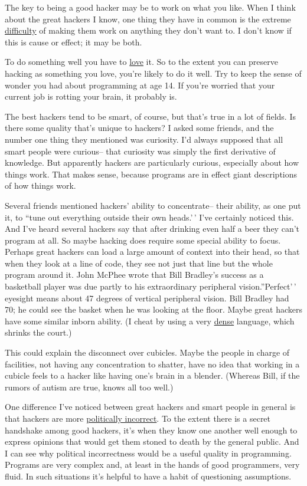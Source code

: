 \documentclass[12pt]{book}
\begin{document}
The key to being a good hacker may be to work on what you like. When I
think about the great hackers I know, one thing they have in common is
the extreme \href{procrastination.html}{difficulty} of making them work
on anything they don't want to. I don't know if this is cause or effect;
it may be both.

To do something well you have to \href{love.html}{love} it. So to the
extent you can preserve hacking as something you love, you're likely to
do it well. Try to keep the sense of wonder you had about programming at
age 14. If you're worried that your current job is rotting your brain,
it probably is.

The best hackers tend to be smart, of course, but that's true in a lot
of fields. Is there some quality that's unique to hackers? I asked some
friends, and the number one thing they mentioned was curiosity. I'd
always supposed that all smart people were curious-- that curiosity was
simply the first derivative of knowledge. But apparently hackers are
particularly curious, especially about how things work. That makes
sense, because programs are in effect giant descriptions of how things
work.

Several friends mentioned hackers' ability to concentrate-- their
ability, as one put it, to ``tune out everything outside their own
heads.'\,' I've certainly noticed this. And I've heard several hackers
say that after drinking even half a beer they can't program at all. So
maybe hacking does require some special ability to focus. Perhaps great
hackers can load a large amount of context into their head, so that when
they look at a line of code, they see not just that line but the whole
program around it. John McPhee wrote that Bill Bradley's success as a
basketball player was due partly to his extraordinary peripheral
vision.''Perfect'\,' eyesight means about 47 degrees of vertical
peripheral vision. Bill Bradley had 70; he could see the basket when he
was looking at the floor. Maybe great hackers have some similar inborn
ability. (I cheat by using a very \href{power.html}{dense} language,
which shrinks the court.)

This could explain the disconnect over cubicles. Maybe the people in
charge of facilities, not having any concentration to shatter, have no
idea that working in a cubicle feels to a hacker like having one's brain
in a blender. (Whereas Bill, if the rumors of autism are true, knows all
too well.)

One difference I've noticed between great hackers and smart people in
general is that hackers are more \href{say.html}{politically incorrect}.
To the extent there is a secret handshake among good hackers, it's when
they know one another well enough to express opinions that would get
them stoned to death by the general public. And I can see why political
incorrectness would be a useful quality in programming. Programs are
very complex and, at least in the hands of good programmers, very fluid.
In such situations it's helpful to have a habit of questioning
assumptions.
\end{document}
